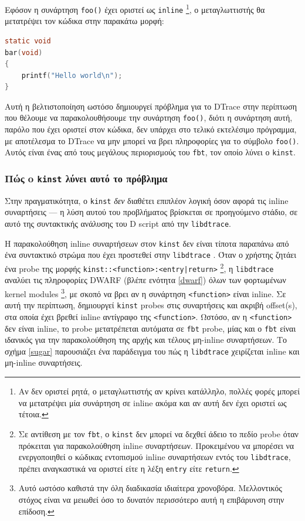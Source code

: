 \documentclass[12pt]{article}
\begin{document}
Εφόσον η συνάρτηση \lstinline{foo()} έχει οριστεί ως \lstinline{inline}
\footnote{
	Αν δεν οριστεί ρητά, ο μεταγλωττιστής αν κρίνει κατάλληλο, πολλές φορές
	μπορεί να μετατρέψει μία συνάρτηση σε inline ακόμα και αν αυτή δεν έχει
	οριστεί ως τέτοια.
},
ο μεταγλωττιστής θα μετατρέψει τον κώδικα στην παρακάτω μορφή:

\begin{lstlisting}[language=C]
static void
bar(void)
{
	printf("Hello world\n");
}
\end{lstlisting}

Αυτή η βελτιστοποίηση ωστόσο δημιουργεί πρόβλημα για το DTrace στην περίπτωση
που θέλουμε να παρακολουθήσουμε την συνάρτηση \lstinline{foo()}, διότι η
συνάρτηση αυτή, παρόλο που έχει οριστεί στον κώδικα, δεν υπάρχει στο τελικό
εκτελέσιμο πρόγραμμα, με αποτέλεσμα το DTrace να μην μπορεί να βρει πληροφορίες
για το σύμβολο \lstinline{foo()}. Αυτός είναι ένας από τους μεγάλους
περιορισμούς του \lstinline{fbt}, τον οποίο λύνει ο \lstinline{kinst}.

\subsubsection{Πώς o \lstinline{kinst} λύνει αυτό το πρόβλημα}

Στην πραγματικότητα, ο \lstinline{kinst} \textit{δεν} διαθέτει επιπλέον λογική
όσον αφορά τις inline συναρτήσεις --- η λύση αυτού του προβλήματος βρίσκεται σε
προηγούμενο στάδιο, σε αυτό της συντακτικής ανάλυσης του D script από την
\lstinline{libdtrace}.

Η παρακολούθηση inline συναρτήσεων στον \lstinline{kinst} δεν είναι τίποτα
παραπάνω από ένα συντακτικό στρώμα που έχει προστεθεί στην
\lstinline{libdtrace} \cite{kinstinline}. Όταν ο χρήστης ζητάει ένα probe της
μορφής \lstinline{kinst::<function>:<entry|return>}
\footnote{
	Σε αντίθεση με τον \lstinline{fbt}, ο \lstinline{kinst} δεν μπορεί να δεχθεί άδειο
	το πεδίο probe όταν πρόκειται για παρακολούθηση inline συναρτήσεων.
	Προκειμένου να μπορέσει να ενεργοποιηθεί ο κώδικας εντοπισμού inline
	συναρτήσεων εντός του \lstinline{libdtrace}, πρέπει αναγκαστικά να
	οριστεί είτε η λέξη \lstinline{entry} είτε \lstinline{return}.
},
η \lstinline{libdtrace} αναλύει τις πληροφορίες DWARF (βλέπε ενότητα
\ref{dwarf}) όλων των φορτωμένων kernel modules
\footnote{
	Αυτό ωστόσο καθιστά την όλη διαδικασία ιδιαίτερα χρονοβόρα. Μελλοντικός
	στόχος είναι να μειωθεί όσο το δυνατόν περισσότερο αυτή η επιβάρυνση
	στην επίδοση.
}, με σκοπό να βρει αν η συνάρτηση
\lstinline{<function>} είναι inline. Σε αυτή την περίπτωση, δημιουργεί
\lstinline{kinst} probes στις συναρτήσεις και ακριβή offset(s), στα οποία έχει
βρεθεί inline αντίγραφο της \lstinline{<function>}. Ωστόσο, αν η
\lstinline{<function>} δεν είναι inline, το probe μετατρέπεται αυτόματα σε
\lstinline{fbt} probe, μίας και ο \lstinline{fbt} είναι ιδανικός για την
παρακολούθηση της αρχής και τέλους μη-inline συναρτήσεων. Το σχήμα \ref{sugar}
παρουσιάζει ένα παράδειγμα του πώς η \lstinline{libdtrace} χειρίζεται inline
και μη-inline συναρτήσεις.
\end{document}
